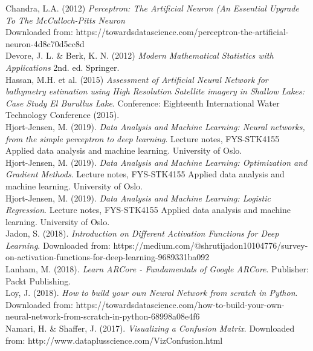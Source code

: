 \documentclass[11pt,english, A4]{article}
\begin{document}
Chandra, L.A. (2012) \textit{Perceptron: The Artificial Neuron (An Essential Upgrade To The McCulloch-Pitts Neuron}\\
Downloaded from: https://towardsdatascience.com/perceptron-the-artificial-neuron-4d8c70d5cc8d\\

Devore, J. L. \& Berk, K. N. (2012) \textit{Modern Mathematical Statistics with Applications} 2nd. ed. Springer. \\

Hassan, M.H. et al. (2015) \textit{Assessment of Artificial Neural Network for bathymetry estimation using High Resolution Satellite imagery in Shallow Lakes: Case Study El Burullus Lake}. Conference: Eighteenth International Water Technology Conference (2015).\\

Hjort-Jensen, M. (2019). \textit{Data Analysis and Machine Learning: Neural networks, from the simple perceptron to deep learning}. Lecture notes, FYS-STK4155 Applied data analysis and machine learning. University of Oslo.\\

Hjort-Jensen, M. (2019). \textit{Data Analysis and Machine Learning: Optimization and Gradient Methods}. Lecture notes, FYS-STK4155 Applied data analysis and machine learning. University of Oslo.\\

Hjort-Jensen, M. (2019). \textit{Data Analysis and Machine Learning: Logistic Regression}. Lecture notes, FYS-STK4155 Applied data analysis and machine learning. University of Oslo.\\

Jadon, S. (2018). \textit{Introduction on Different Activation Functions for Deep Learning}. 
Downloaded from: https://medium.com/@shrutijadon10104776/survey-on-activation-functions-for-deep-learning-9689331ba092\\

Lanham, M. (2018). \textit{Learn ARCore - Fundamentals of Google ARCore}. Publisher: Packt Publishing.\\

Loy, J. (2018). \textit{How to build your own Neural Network from scratch in Python}.\\
Downloaded from: https://towardsdatascience.com/how-to-build-your-own-neural-network-from-scratch-in-python-68998a08e4f6\\

Namari, H. \& Shaffer, J. (2017). \textit{Visualizing a Confusion Matrix}. 
Downloaded from: http://www.dataplusscience.com/VizConfusion.html\\
\end{document}
